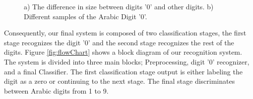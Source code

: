 \documentclass[times, 10pt,twocolumn]{article}
\begin{document}
\begin{figure}
	\centering
	\caption[Arabic '0' Digit] {a) The difference in size between digits '0' and
	other digits. b) Different samples of the Arabic Digit '0'.}
	\label{fig:zeroVersusOtherAllFig}
\end{figure}



% 
% 

 Consequently,  our final system is composed of two classification stages, the first stage recognizes the digit '0' and the second stage recognizes the rest of the digits. Figure \ref{fig:flowChart} shows a block diagram of our recognition system. The system is divided into three main blocks; Preprocessing, digit '0' recognizer, and a final Classifier. The first classification stage output is either labeling the digit as a zero or continuing to the next stage. The final stage discriminates between Arabic digits from 1 to 9.
\end{document}
